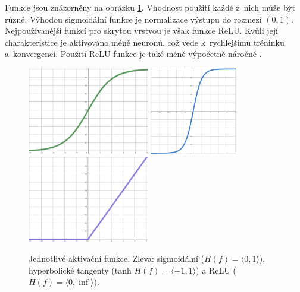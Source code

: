 Funkce jsou znázorněny na obrázku \ref{aktivacni_funkce}. Vhodnost použití každé z~nich může být různé. Výhodou sigmoidální funkce je normalizace výstupu do rozmezí $(0,1)$. Nejpoužívanější funkcí pro skrytou vrstvou je však funkce ReLU. Kvůli její charakteristice je aktivováno méně neuronů, což vede k~rychlejšímu tréninku a~konvergenci. Použití ReLU funkce je také méně výpočetně náročné \cite{medium:activation_function}.

\begin{figure}[hbt]
    \centering
	    \includegraphics[width=0.33\linewidth, height=1.5in]{obrazky/sigmoid.pdf}\hfill
    	\includegraphics[width=0.33\linewidth, height=1.5in]{obrazky/tanh.pdf}\hfill
    	\includegraphics[width=0.33\linewidth, height=1.5in]{obrazky/relu.pdf}\hfill
	\caption{Jednotlivé aktivační funkce. Zleva: sigmoidální ($H(f)=\langle 0,1 \rangle$), hyperbolické tangenty (tanh $H(f)=\langle -1,1 \rangle$) a ReLU ($H(f)=\langle 0,\inf \rangle$).}
	\label{aktivacni_funkce}
\end{figure}


